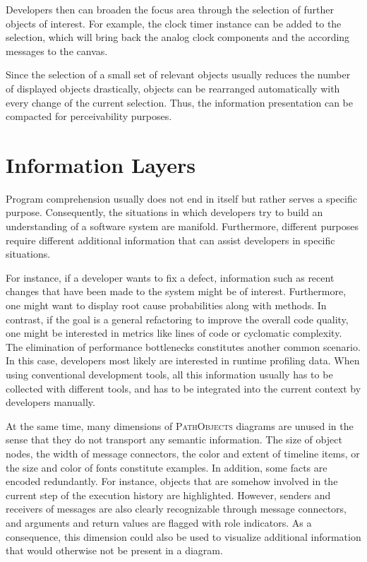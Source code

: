 Developers then can broaden the focus area through the selection of further objects of interest.
For example, the clock timer instance can be added to the selection, which will bring back the analog clock components and the according messages to the canvas.

Since the selection of a small set of relevant objects usually reduces the number of displayed objects drastically, objects can be rearranged automatically with every change of the current selection.
Thus, the information presentation can be compacted for perceivability purposes.

\section{Information Layers}
\label{s:ApproachLayers}
Program comprehension usually does not end in itself but rather serves a specific purpose.
Consequently, the situations in which developers try to build an understanding of a software system are manifold.
Furthermore, different purposes require different additional information that can assist developers in specific situations.

For instance, if a developer wants to fix a defect, information such as recent changes that have been made to the system might be of interest.
Furthermore, one might want to display root cause probabilities along with methods.
In contrast, if the goal is a general refactoring to improve the overall code quality, one might be interested in metrics like lines of code or cyclomatic complexity.
The elimination of performance bottlenecks constitutes another common scenario.
In this case, developers most likely are interested in runtime profiling data.
When using conventional development tools, all this information usually has to be collected with different tools, and has to be integrated into the current context by developers manually.

At the same time, many dimensions of \textsc{PathObjects} diagrams are unused in the sense that they do not transport any semantic information.
The size of object nodes, the width of message connectors, the color and extent of timeline items, or the size and color of fonts constitute examples.
In addition, some facts are encoded redundantly.
For instance, objects that are somehow involved in the current step of the execution history are highlighted.
However, senders and receivers of messages are also clearly recognizable through  message connectors, and arguments and return values are flagged with role indicators.
As a consequence, this dimension could also be used to visualize additional information that would otherwise not be present in a diagram.

